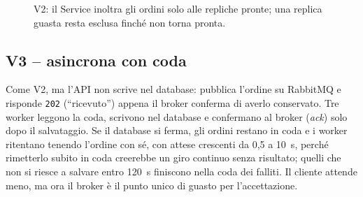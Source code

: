\begin{figure}[H]
\centering
{}
\caption{V2: il Service inoltra gli ordini solo alle repliche pronte; una replica guasta resta esclusa finché non torna pronta.}
\label{fig:v2}
\end{figure}

\subsection{V3 -- asincrona con coda}
\label{s:v3}

Come V2, ma l'API non scrive nel database: pubblica l'ordine su RabbitMQ e risponde \texttt{202} (``ricevuto'') appena il broker conferma di averlo conservato. Tre worker leggono la coda, scrivono nel database e confermano al broker (\textit{ack}) solo dopo il salvataggio. Se il database si ferma, gli ordini restano in coda e i worker ritentano tenendo l'ordine con sé, con attese crescenti da 0,5 a 10~s, perché rimetterlo subito in coda creerebbe un giro continuo senza risultato; quelli che non si riesce a salvare entro 120~s finiscono nella coda dei falliti. Il cliente attende meno, ma ora il broker è il punto unico di guasto per l'accettazione.

